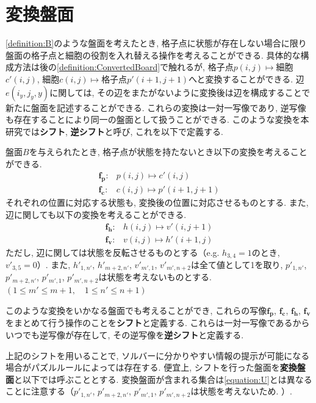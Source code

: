 \section{変換盤面}\label{section:ConvertedBoard}
\cref{definition:B}のような盤面を考えたとき, 格子点に状態が存在しない場合に限り盤面の格子点と細胞の役割を入れ替える操作を考えることができる. 具体的な構成方法は後の\cref{definition:ConvertedBoard}で触れるが, 格子点$p(i,j)\mapsto$細胞$c'(i,j)$, 細胞$c(i,j)\mapsto$格子点$p'(i+1,j+1)$へと変換することができる. 辺$e(i_y,j_y,y)$に関しては, その辺をまたがないように変換後は辺を構成することで新たに盤面を記述することができる. これらの変換は一対一写像であり, 逆写像も存在することにより同一の盤面として扱うことができる. このような変換を本研究では\textbf{シフト}, \textbf{逆シフト}と呼び, これを以下で定義する.
\begin{definition}\label{definition:ConvertedBoard}
  盤面$B$を与えられたとき, 格子点が状態を持たないとき以下の変換を考えることができる.
  \begin{align}
    \bm{f_p}\colon & p(i,j)  \longmapsto c'(i,j)     \\
    \bm{f_c}\colon & c(i,j)  \longmapsto p'(i+1,j+1)
  \end{align}
  それぞれの位置に対応する状態も, 変換後の位置に対応させるものとする. また, 辺に関しても以下の変換を考えることができる.
  \begin{align}
    \bm{f_h}\colon & h(i,j)  \longmapsto v'(i,j+1) \\
    \bm{f_v}\colon & v(i,j)  \longmapsto h'(i+1,j)
  \end{align}
  ただし, 辺に関しては状態を反転させるものとする（e.g. $h_{3,4}=1$のとき, $v'_{3,5}=0$）. また, $h'_{1,n'}$, $h'_{m+2,n'}$, $v'_{m',1}$, $v'_{m',n+2}$は全て値として1を取り, $p'_{1,n'}$, $p'_{m+2,n'}$, $p'_{m',1}$, $p'_{m',n+2}$は状態を考えないものとする. $(1\le m' \le m+1, \quad 1\le n'\le n+1)$

  このような変換をいかなる盤面でも考えることができ, これらの写像$\bm{f_p}$, $\bm{f_c}$, $\bm{f_h}$, $\bm{f_v}$をまとめて行う操作のことを\textbf{シフト}と定義する. これらは一対一写像であるからいつでも逆写像が存在して, その逆写像を\textbf{逆シフト}と定義する.
\end{definition}
上記のシフトを用いることで, ソルバーに分かりやすい情報の提示が可能になる場合がパズルルールによっては存在する. 便宜上, シフトを行った盤面を\textbf{変換盤面}と以下では呼ぶこととする. 変換盤面が含まれる集合は\cref{equation:U}とは異なることに注意する（$p'_{1,n'}$, $p'_{m+2,n'}$, $p'_{m',1}$, $p'_{m',n+2}$は状態を考えないため. ）.

